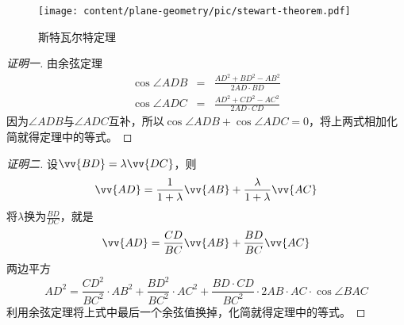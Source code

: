 \begin{figure}[htbp]
\centering
\texttt{[image: content/plane-geometry/pic/stewart-theorem.pdf]}
\caption{斯特瓦尔特定理}
\label{fig:stewart-theorem}
\end{figure}

\begin{proof}[证明一]
  由余弦定理
  \begin{eqnarray*}
    \cos{\angle ADB} & = & \frac{AD^2+BD^2-AB^2}{2 AD \cdot BD} \\
    \cos{\angle ADC} & = & \frac{AD^2+CD^2-AC^2}{2 AD \cdot CD} 
  \end{eqnarray*}
  因为$\angle ADB$与$\angle ADC$互补，所以$\cos{\angle ADB} + \cos{\angle ADC} = 0$，将上两式相加化简就得定理中的等式。
\end{proof}

\begin{proof}[证明二]
  设$\vv{BD}=\lambda \vv{DC}$，则
  \begin{equation*}
    \vv{AD}=\frac{1}{1+\lambda}\vv{AB}+\frac{\lambda}{1+\lambda}\vv{AC}
  \end{equation*}
  将$\lambda$换为$\frac{BD}{DC}$，就是
  \begin{equation*}
    \vv{AD}=\frac{CD}{BC}\vv{AB}+\frac{BD}{BC}\vv{AC}
  \end{equation*}
  两边平方
  \begin{equation*}
    AD^2=\frac{CD^2}{BC^2} \cdot AB^2 + \frac{BD^2}{BC^2} \cdot AC^2 + \frac{ BD \cdot CD}{BC^2} \cdot 2 AB \cdot AC \cdot \cos{\angle BAC}
  \end{equation*}
  利用余弦定理将上式中最后一个余弦值换掉，化简就得定理中的等式。
\end{proof}

